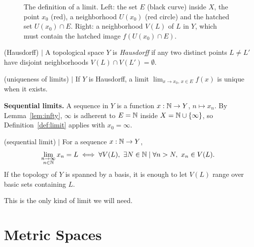 \begin{figure}[H]
\caption{The definition of a limit. Left: the set $E$ (black curve) inside
$X$, the point $x_0$ (red), a neighborhood $U(x_0)$ (red circle) and the
hatched set $U(x_0)\cap E$. Right: a neighborhood $V(L)$ of $L$ in $Y$, which
must contain the hatched image $f(U(x_0)\cap E)$.}
\end{figure}

\begin{definition} (Hausdorff) $\mid$
A topological space $Y$ is \emph{Hausdorff} if any two distinct points
$L\ne L'$ have disjoint neighborhoods $V(L)\cap V(L')=\emptyset$.
\end{definition}

\begin{lemma} (uniqueness of limits) $\mid$ \label{lem:unique}
If $Y$ is Hausdorff, a limit $\lim_{x\to x_0,\,x\in E} f(x)$ is unique when it
exists.
\end{lemma}

\noindent\textbf{Sequential limits.} A sequence in $Y$ is a function
$x:\mathbb{N}\to Y$, $n\mapsto x_n$. By Lemma~\ref{lem:infty}, $\infty$ is adherent to
$E=\mathbb{N}$ inside $X=\mathbb{N}\cup\{\infty\}$, so Definition~\ref{def:limit} applies with
$x_0=\infty$.

\begin{corollary} (sequential limit) $\mid$ \label{cor:seqlim}
For a sequence $x:\mathbb{N}\to Y$,
\[
\lim_{\substack{n \to \infty \\ n \in \mathbb{N}}} x_n = L
\iff
\forall V(L),\ \exists N\in\mathbb{N} \mid \forall n>N,\ x_n \in V(L).
\]
If the topology of $Y$ is spanned by a basis, it is enough to let $V(L)$ range
over basic sets containing $L$.
\end{corollary}

This is the only kind of limit we will need.



\section{Metric Spaces}

